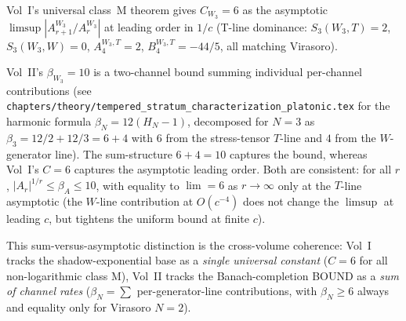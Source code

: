 \begin{remark}[\label{rem:beta-A-W3-sharpening}
Reconciling $C_{W_3} = 6$ with $\beta_{W_3} = 10$]
Vol~I's universal class~M theorem gives $C_{W_3} = 6$ as the
asymptotic $\limsup|A_{r+1}^{W_3}/A_r^{W_3}|$ at leading order in
$1/c$ (T-line dominance:
$S_3(W_3, T) = 2$, $S_3(W_3, W) = 0$, $A_4^{W_3, T} = 2$,
$B_4^{W_3, T} = -44/5$, all matching Virasoro).

Vol~II's $\beta_{W_3} = 10$ is a two-channel bound summing individual
per-channel contributions (see
\verb|chapters/theory/tempered_stratum_characterization_platonic.tex|
for the harmonic formula $\beta_N=12(H_N-1)$, decomposed for $N = 3$
as $\beta_3 = 12/2 + 12/3 = 6 + 4$ with $6$ from the stress-tensor $T$-line and
$4$ from the $W$-generator line). The sum-structure $6 + 4 = 10$
captures the bound, whereas Vol~I's $C = 6$ captures the
asymptotic leading order. Both are consistent: for all $r$,
$|A_r|^{1/r} \le \beta_A \le 10$, with equality to $\lim = 6$ as
$r \to \infty$ only at the $T$-line asymptotic (the $W$-line
contribution at $O(c^{-4})$ does not change the $\limsup$ at
leading $c$, but tightens the uniform bound at finite $c$).

This sum-versus-asymptotic distinction is the cross-volume coherence:
Vol~I tracks the shadow-exponential base as a \emph{single universal
constant} ($C = 6$ for all non-logarithmic class M), Vol~II tracks
the Banach-completion BOUND as a \emph{sum of channel rates}
($\beta_N = \sum$ per-generator-line contributions, with $\beta_N \ge
6$ always and equality only for Virasoro $N = 2$).
\end{remark}

